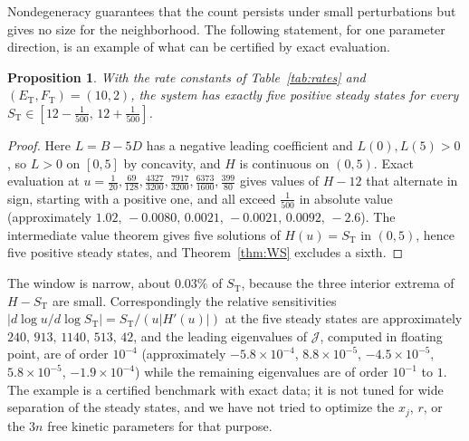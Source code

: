 \documentclass[11pt]{article}
\theoremstyle{plain}
\newtheorem{proposition}[theorem]{Proposition}
\theoremstyle{definition}
\theoremstyle{remark}
\numberwithin{equation}{section}
\newcommand{\ET}{E_{\mathrm T}}
\newcommand{\FT}{F_{\mathrm T}}
\newcommand{\ST}{S_{\mathrm T}}
\newcommand{\JS}{\mathcal J}
\begin{document}
Nondegeneracy guarantees that the count persists under small perturbations but gives no size
for the neighborhood. The following statement, for one parameter direction, is an example of
what can be certified by exact evaluation.

\begin{proposition}\label{prop:window}
With the rate constants of Table~\ref{tab:rates} and \((\ET,\FT)=(10,2)\), the system has
exactly five positive steady states for every \(\ST\in[12-\tfrac1{500},\,12+\tfrac1{500}]\).
\end{proposition}
\begin{proof}
Here \(L=B-5D\) has a negative leading coefficient and \(L(0),L(5)>0\), so \(L>0\) on
\([0,5]\) by concavity, and \(H\) is continuous on \((0,5)\). Exact evaluation at
\(u=\tfrac1{20},\tfrac{69}{128},\tfrac{4327}{3200},\tfrac{7917}{3200},\tfrac{6373}{1600},
\tfrac{399}{80}\) gives values of \(H-12\) that alternate in sign, starting with a positive
one, and all exceed \(\tfrac1{500}\) in absolute value (approximately
\(1.02,\,-0.0080,\,0.0021,\,-0.0021,\,0.0092,\,-2.6\)). The intermediate value theorem gives five
solutions of \(H(u)=\ST\) in \((0,5)\), hence five positive steady states, and
Theorem~\ref{thm:WS} excludes a sixth.
\end{proof}

The window is narrow, about \(0.03\%\) of \(\ST\), because the three interior extrema of
\(H-\ST\) are small. Correspondingly the relative sensitivities
\(|d\log u/d\log\ST|=\ST/(u|H'(u)|)\) at the five steady states are approximately
\(240,\,913,\,1140,\,513,\,42\), and the leading eigenvalues of \(\JS\), computed in floating
point, are of order \(10^{-4}\) (approximately \(-5.8\times10^{-4}\), \(8.8\times10^{-5}\),
\(-4.5\times10^{-5}\), \(5.8\times10^{-5}\), \(-1.9\times10^{-4}\)) while the remaining
eigenvalues are of order \(10^{-1}\) to \(1\). The example is a certified benchmark with exact
data; it is not tuned for wide separation of the steady states, and we have not tried to
optimize the \(x_j\), \(r\), or the \(3n\) free kinetic parameters for that purpose.
\end{document}
